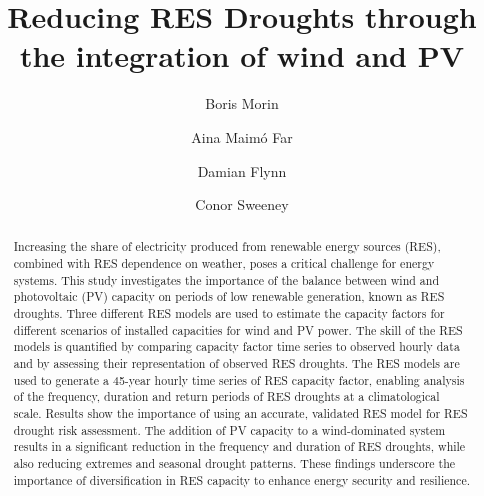 \documentclass[preprint, 12pt]{elsarticle}
\begin{document}
\begin{frontmatter}
	

\title{Reducing RES Droughts through the integration of wind and PV}

\author[Math]{Boris Morin }

\author[Math]{Aina Maimó Far}

\author[Eng]{Damian Flynn}

\author[Math]{Conor Sweeney}




\begin{abstract}
Increasing the share of electricity produced from renewable energy sources (RES), combined with RES dependence on weather, poses a critical challenge for energy systems. This study investigates the importance of the balance between wind and photovoltaic (PV) capacity on periods of low renewable generation, known as RES droughts. Three different RES models are used to estimate the capacity factors for different scenarios of installed capacities for wind and PV power. The skill of the RES models is quantified by comparing capacity factor time series to observed hourly data and by assessing their representation of observed RES droughts. The RES models are used to generate a 45-year hourly time series of RES capacity factor, enabling analysis of the frequency, duration and return periods of RES droughts at a climatological scale. Results show the importance of using an accurate, validated RES model for RES drought risk assessment. The addition of PV capacity to a wind-dominated system results in a significant reduction in the frequency and duration of RES droughts, while also reducing extremes and seasonal drought patterns. These findings underscore the importance of diversification in RES capacity to enhance energy security and resilience.
\end{abstract}


\end{frontmatter}
\end{document}

